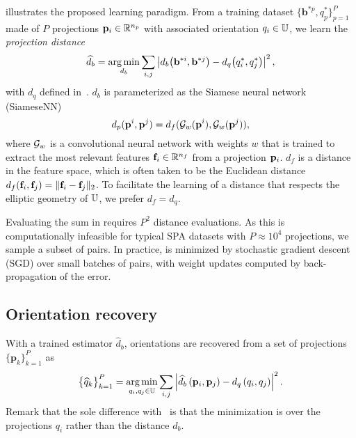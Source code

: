  illustrates the proposed learning paradigm.
From a training dataset $\big\{ \mathbf{b}^{*p}, q^*_p \big\}_{p=1}^{P}$ made of $P$ projections $\mathbf{p}_i \in \mathbb{R}^{n_p}$ with associated orientation $q_i \in \mathbb{U}$, we learn the \textit{projection distance}
\begin{equation}
    \widehat{d}_b = \operatorname*{arg\,min}_{d_b} \sum_{i,j} \left| d_b\big(\mathbf{b}^{*i},\mathbf{b}^{*j}\big) - d_q\big(q^*_i,q^*_j\big) \right|^2,
    \label{eqn:distance-learning}
\end{equation}
with $d_q$ defined in~.
$d_b$ is parameterized as the Siamese neural network (SiameseNN)~\cite{chopra2005learning} 
\begin{equation}
    d_p(\mathbf{p}^i, \mathbf{p}^j) = d_f(\mathcal{G}_w(\mathbf{p}^i), \mathcal{G}_w(\mathbf{p}^j)),
    \label{eqn:distance:projections}
\end{equation}
where $\mathcal{G}_w$ is a convolutional neural network with weights $w$ that is trained to extract the most relevant features $\mathbf{f}_i \in \mathbb{R}^{n_f}$ from a projection $\mathbf{p}_i$.
$d_f$ is a distance in the feature space, which is often taken to be the Euclidean distance $d_f(\mathbf{f}_i, \mathbf{f}_j) = \Vert \mathbf{f}_i - \mathbf{f}_j \Vert_2$.
To facilitate the learning of a distance that respects the elliptic geometry of $\mathbb{U}$, we prefer $d_f = d_q$.

Evaluating the sum in  requires $P^2$ distance evaluations.
As this is computationally infeasible for typical SPA datasets with $P \approx 10^4$ projections, we sample a subset of pairs.
In practice,  is minimized by stochastic gradient descent (SGD) over small batches of pairs, with weight updates computed by back-propagation of the error.

\subsection{Orientation recovery}\label{sec:method:orientation-recovery}

With a trained estimator $\widehat{d}_b$, orientations are recovered from a set of projections $\big\{ \mathbf{p}_k \big\}_{k=1}^P$ as
\begin{equation}
    \big\{ \widehat{q}_k \big\}_{k=1}^P = \operatorname*{arg\,min}_{q_i, q_j \in \mathbb{U}} \sum_{i,j} \left| \widehat{d}_b \left( \mathbf{p}_i, \mathbf{p}_j \right) - d_q\left(q_i,q_j\right) \right|^2.
    \label{eqn:orientation-recovery}
\end{equation}
Remark that the sole difference with~ is that the minimization is over the projections $q_i$ rather than the distance $d_b$.

